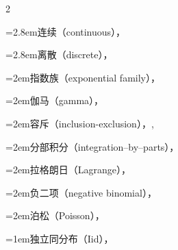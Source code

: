 \begin{multicols}{2}
\par\noindent\hangindent=2.8em\hspace*{1.8em}\label{idx:536}连续（continuous），\hyperref[exercise:2.14]{\pageref*{exercise:2.14}}\par
\par\noindent\hangindent=2.8em\hspace*{1.8em}\label{idx:537}离散（discrete），\hyperref[exercise:2.14]{\pageref*{exercise:2.14}}\par
\par\noindent\hangindent=2em\hspace*{1em}\label{idx:538}指数族（exponential family），\hyperref[thm:3.4.2]{\pageref*{thm:3.4.2}}\par
\par\noindent\hangindent=2em\hspace*{1em}\label{idx:539}伽马（gamma），\hyperref[idxocc:539:142]{\pageref*{idxocc:539:142}}\par
\par\noindent\hangindent=2em\hspace*{1em}\label{idx:540}容斥（inclusion-exclusion），\hyperref[exercise:1.42]{\pageref*{exercise:1.42}}, \hyperref[idxocc:540:68]{\pageref*{idxocc:540:68}}\par
\par\noindent\hangindent=2em\hspace*{1em}\label{idx:541}分部积分（integration–by–parts），\hyperref[lem:3.6.5]{\pageref*{lem:3.6.5}}\par
\par\noindent\hangindent=2em\hspace*{1em}\label{idx:542}拉格朗日（Lagrange），\hyperref[exercise:5.9]{\pageref*{exercise:5.9}}\par
\par\noindent\hangindent=2em\hspace*{1em}\label{idx:543}负二项（negative binomial），\hyperref[eq:3.6.6]{\pageref*{eq:3.6.6}}\par
\par\noindent\hangindent=2em\hspace*{1em}\label{idx:544}泊松（Poisson），\hyperref[eq:3.6.5]{\pageref*{eq:3.6.5}}\par
\par\addvspace{2pt}
\par\noindent\hangindent=1em\hspace*{0em}\label{idx:545}独立同分布（Iid），\hyperref[def:5.1.1]{\pageref*{def:5.1.1}}\par

\end{multicols}
